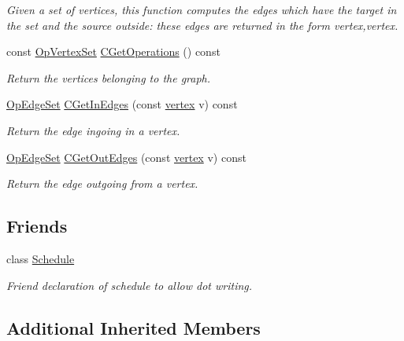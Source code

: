 \begin{DoxyCompactItemize}
\begin{DoxyCompactList}\small\item\em Given a set of vertices, this function computes the edges which have the target in the set and the source outside\+: these edges are returned in the form vertex,vertex. \end{DoxyCompactList}\item 
const \hyperlink{classOpVertexSet}{Op\+Vertex\+Set} \hyperlink{structOpGraph_a6a68fec329f88429b5b455dbcd2f2427}{C\+Get\+Operations} () const
\begin{DoxyCompactList}\small\item\em Return the vertices belonging to the graph. \end{DoxyCompactList}\item 
\hyperlink{classOpEdgeSet}{Op\+Edge\+Set} \hyperlink{structOpGraph_a9619c072b9bc1e6990db32d43fb358ef}{C\+Get\+In\+Edges} (const \hyperlink{graph_8hpp_abefdcf0544e601805af44eca032cca14}{vertex} v) const
\begin{DoxyCompactList}\small\item\em Return the edge ingoing in a vertex. \end{DoxyCompactList}\item 
\hyperlink{classOpEdgeSet}{Op\+Edge\+Set} \hyperlink{structOpGraph_a515cdea7270316a2dcaabecaab6e4994}{C\+Get\+Out\+Edges} (const \hyperlink{graph_8hpp_abefdcf0544e601805af44eca032cca14}{vertex} v) const
\begin{DoxyCompactList}\small\item\em Return the edge outgoing from a vertex. \end{DoxyCompactList}\end{DoxyCompactItemize}
\subsection*{Friends}
\begin{DoxyCompactItemize}
\item 
class \hyperlink{structOpGraph_aae5808dc2e987bf17ef42196457a654d}{Schedule}
\begin{DoxyCompactList}\small\item\em Friend declaration of schedule to allow dot writing. \end{DoxyCompactList}\end{DoxyCompactItemize}
\subsection*{Additional Inherited Members}


